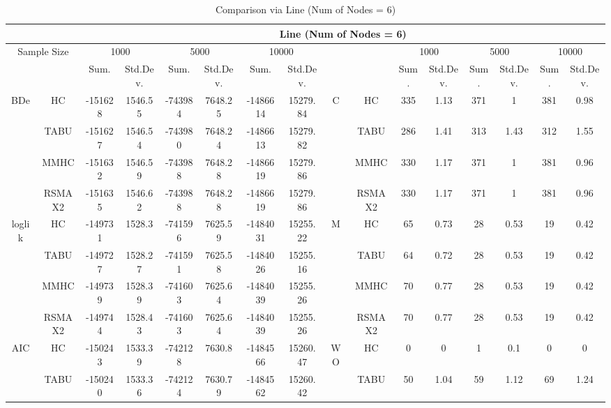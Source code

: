 \begin{table}[p]																										
\centering	\caption{Comparison via Line (Num of Nodes = 6)}	\tiny																						
{\tabcolsep=0.01in																										
\begin{tabular}{cc||cc|cc|cc||cc|cc|cc|cc}																										
\hline																										
&	&	\multicolumn{14}{c}{Line	(Num	of	Nodes	=	6)}\tabularnewline																			
\hline																										
\multicolumn{2}{c||}{Sample	Size}	&	\multicolumn{2}{c|}{1000}	&	\multicolumn{2}{c|}{5000}	&	\multicolumn{2}{c||}{10000}	&	&	&	\multicolumn{2}{c|}{1000}	&	\multicolumn{2}{c|}{5000}	&	\multicolumn{2}{c}{10000}\tabularnewline											
\hline																										
&	&	Sum.	&	Std.Dev.	&	Sum.	&	Std.Dev.	&	Sum.	&	Std.Dev.	&	&	&	Sum.	&	Std.Dev.	&	Sum.	&	Std.Dev.	&	Sum.	&	Std.Dev.\tabularnewline
\hline																										
\hline																										
\multirow{4}{*}{BDe} & HC &	-151628 & 	1546.55 & 	-743984 & 	7648.25 & 	-1486614 & 	15279.84 & 	\multirow{4}{*}{C} & HC &	335 & 	1.13 & 	371 & 	1 & 	381 & 	0.98\tabularnewline													
& TABU &	-151627 & 	1546.54 & 	-743980 & 	7648.24 & 	-1486613 & 	15279.82 & 	& TABU &	286 & 	1.41 & 	313 & 	1.43 & 	312 & 	1.55\tabularnewline													
& MMHC &	-151632 & 	1546.59 & 	-743988 & 	7648.28 & 	-1486619 & 	15279.86 & 	& MMHC &	330 & 	1.17 & 	371 & 	1 & 	381 & 	0.96\tabularnewline													
& RSMAX2 &	-151635 & 	1546.62 & 	-743988 & 	7648.28 & 	-1486619 & 	15279.86 & 	& RSMAX2 &	330 & 	1.17 & 	371 & 	1 & 	381 & 	0.96\tabularnewline													
\hline																										
\multirow{4}{*}{loglik} & HC &	-149731 & 	1528.3 & 	-741596 & 	7625.59 & 	-1484031 & 	15255.22 & 	\multirow{4}{*}{M} & HC &	65 & 	0.73 & 	28 & 	0.53 & 	19 & 	0.42\tabularnewline													
& TABU &	-149727 & 	1528.27 & 	-741591 & 	7625.58 & 	-1484026 & 	15255.16 & 	& TABU &	64 & 	0.72 & 	28 & 	0.53 & 	19 & 	0.42\tabularnewline													
& MMHC &	-149739 & 	1528.39 & 	-741603 & 	7625.64 & 	-1484039 & 	15255.26 & 	& MMHC &	70 & 	0.77 & 	28 & 	0.53 & 	19 & 	0.42\tabularnewline													
& RSMAX2 &	-149744 & 	1528.43 & 	-741603 & 	7625.64 & 	-1484039 & 	15255.26 & 	& RSMAX2 &	70 & 	0.77 & 	28 & 	0.53 & 	19 & 	0.42\tabularnewline													
\hline																										
\multirow{4}{*}{AIC} & HC &	-150243 & 	1533.39 & 	-742128 & 	7630.8 & 	-1484566 & 	15260.47 & 	\multirow{4}{*}{WO} & HC &	0 & 	0 & 	1 & 	0.1 & 	0 & 	0\tabularnewline													
& TABU &	-150240 & 	1533.36 & 	-742124 & 	7630.79 & 	-1484562 & 	15260.42 & 	& TABU &	50 & 	1.04 & 	59 & 	1.12 & 	69 & 	1.24\tabularnewline													

\end{tabular}}
\end{table}
